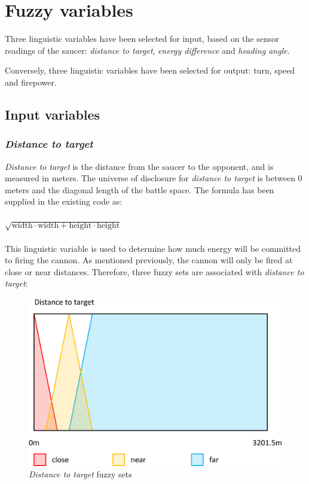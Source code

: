 \newpage

\section{Fuzzy variables}

Three linguistic variables have been selected for input, based on the sensor readings of the saucer: \emph{distance to target}, \emph{energy difference} and \emph{heading angle}.

Conversely, three linguistic variables have been selected for output: turn, speed and firepower.

\subsection{Input variables}

\subsubsection{\emph{Distance to target}}

\emph{Distance to target} is the distance from the saucer to the opponent, and is measured in meters. The universe of disclosure for \emph{distance to target} is between 0 meters and the diagonal length of the battle space. The formula has been supplied in the existing code as:
\\
\\
$\sqrt{\mbox{width} \cdot \mbox{width} + \mbox{height} \cdot \mbox{height}}$
\\
\\
This linguistic variable is used to determine how much energy will be committed to firing the cannon. As mentioned previously, the cannon will only be fired at close or near distances. Therefore, three fuzzy sets are associated with \emph{distance to target}:

\begin{figure}[H]
\centering
\caption{\emph{Distance to target} fuzzy sets}
\includegraphics[scale=0.1]{./img/pdf/distanceSets.pdf}
\end{figure}

